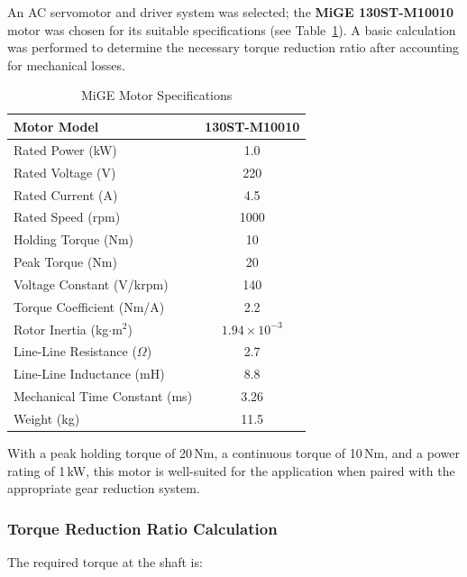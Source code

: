 An AC servomotor and driver system was selected; the \textbf{MiGE 130ST-M10010} motor was chosen for its suitable specifications (see Table~\ref{tab:motor_specs}). A basic calculation was performed to determine the necessary torque reduction ratio after accounting for mechanical losses.

\begin{table}[H]
    \centering
    \begin{tabular}{|l|c|}
        \hline
        \textbf{Motor Model} & 130ST-M10010 \\
        \hline
        Rated Power (kW) & 1.0 \\
        \hline
        Rated Voltage (V) & 220 \\
        \hline
        Rated Current (A) & 4.5 \\
        \hline
        Rated Speed (rpm) & 1000 \\
        \hline
        Holding Torque (Nm) & 10 \\
        \hline
        Peak Torque (Nm) & 20 \\
        \hline
        Voltage Constant (V/krpm) & 140 \\
        \hline
        Torque Coefficient (Nm/A) & 2.2 \\
        \hline
        Rotor Inertia (kg$\cdot$m$^2$) & $1.94 \times 10^{-3}$ \\
        \hline
        Line-Line Resistance ($\Omega$) & 2.7 \\
        \hline
        Line-Line Inductance (mH) & 8.8 \\
        \hline
        Mechanical Time Constant (ms) & 3.26 \\
        \hline
        Weight (kg) & 11.5 \\
        \hline
    \end{tabular}
    \caption{MiGE Motor Specifications}
    \label{tab:motor_specs}
\end{table}

With a peak holding torque of 20\,Nm, a continuous torque of 10\,Nm, and a power rating of 1\,kW, this motor is well-suited for the application when paired with the appropriate gear reduction system.

\subsubsection*{Torque Reduction Ratio Calculation}

The required torque at the shaft is:

